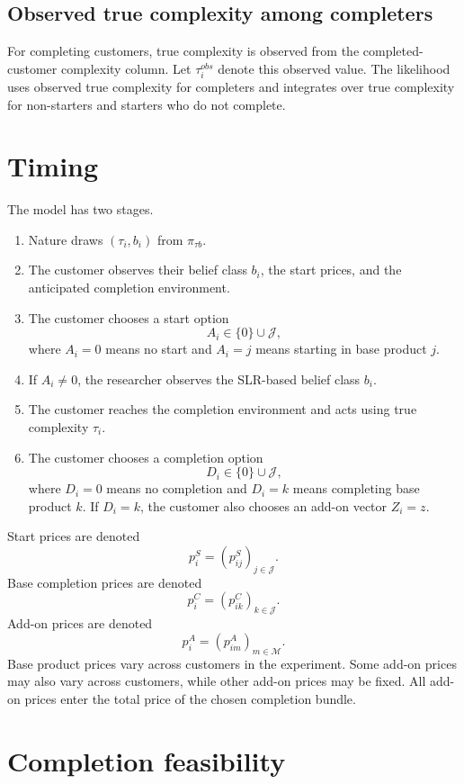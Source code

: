 \documentclass[11pt]{article}
\newcommand{\J}{\mathcal{J}}
\newcommand{\Mset}{\mathcal{M}}
\begin{document}
\subsection*{Observed true complexity among completers}

For completing customers, true complexity is observed from the completed-customer complexity column. Let $\tau_i^{obs}$ denote this observed value. The likelihood uses observed true complexity for completers and integrates over true complexity for non-starters and starters who do not complete.

\section{Timing}

The model has two stages.

\begin{enumerate}
\item Nature draws $(\tau_i,b_i)$ from $\pi_{\tau b}$.
\item The customer observes their belief class $b_i$, the start prices, and the anticipated completion environment.
\item The customer chooses a start option
\[
A_i\in\{0\}\cup\J,
\]
where $A_i=0$ means no start and $A_i=j$ means starting in base product $j$.
\item If $A_i\neq 0$, the researcher observes the SLR-based belief class $b_i$.
\item The customer reaches the completion environment and acts using true complexity $\tau_i$.
\item The customer chooses a completion option
\[
D_i\in\{0\}\cup\J,
\]
where $D_i=0$ means no completion and $D_i=k$ means completing base product $k$. If $D_i=k$, the customer also chooses an add-on vector $Z_i=z$.
\end{enumerate}

Start prices are denoted
\[
p_i^S=(p_{ij}^S)_{j\in\J}.
\]
Base completion prices are denoted
\[
p_i^C=(p_{ik}^C)_{k\in\J}.
\]
Add-on prices are denoted
\[
p_i^A=(p_{im}^A)_{m\in\Mset}.
\]
Base product prices vary across customers in the experiment. Some add-on prices may also vary across customers, while other add-on prices may be fixed. All add-on prices enter the total price of the chosen completion bundle.

\section{Completion feasibility}
\end{document}
